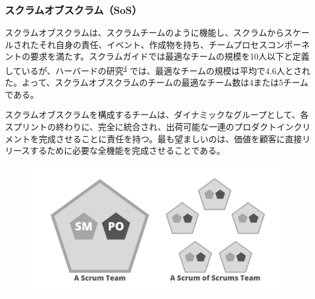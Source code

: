 \documentclass[12pt,a4paper,parskip=full]{scrartcl}
\begin{document}

\subsubsection{スクラムオブスクラム（SoS）}\label{the-scrum-of-scrums}

スクラムオブスクラムは、スクラムチームのように機能し、スクラムからスケールされたそれ自身の責任、イベント、作成物を持ち、チームプロセスコンポーネントの要求を満たす。スクラムガイドでは最適なチームの規模を10人以下と定義しているが、ハーバードの研究\textsuperscript{\hyperref[citation4]{4}} では、最適なチームの規模は平均で4.6人とされた。よって、スクラムオブスクラムのチームの最適なチーム数は4または5チームである。

スクラムオブスクラムを構成するチームは、ダイナミックなグループとして、各スプリントの終わりに、完全に統合され、出荷可能な一連のプロダクトインクリメントを完成させることに責任を持つ。最も望ましいのは、価値を顧客に直接リリースするために必要な全機能を完成させることである。


\begin{figure}[H]
    \centering
    \includegraphics[scale=0.15]{1.png}
\end{figure}
\end{document}
